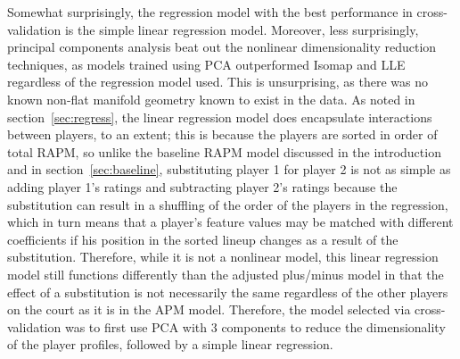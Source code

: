 \begin{table}
    \centering
    \noindent{}
    \caption{A summary of the results of hyperparameter tuning and cross-validation;
    each entry in the table is the cross-validation root mean squared error for a
    given combination of dimensionality reduction and regression techniques.}
    \label{tab:cv_results}
\end{table}

Somewhat surprisingly, the regression model with the best performance in
cross-validation is the simple linear regression model. Moreover, less surprisingly,
principal components analysis beat out the nonlinear dimensionality reduction
techniques, as models trained using PCA outperformed Isomap and LLE regardless of
the regression model used. This is unsurprising, as there was no known non-flat
manifold geometry known to exist in the data. As noted in section~\ref{sec:regress},
the linear regression model does encapsulate interactions between players, to an
extent; this is because the players are sorted in order of total RAPM, so unlike the
baseline RAPM model discussed in the introduction and in section~\ref{sec:baseline},
substituting player 1 for player 2 is not as simple as adding player 1's ratings
and subtracting player 2's ratings because the substitution can result in a
shuffling of the order of the players in the regression, which in turn means that a
player's feature values may be matched with different coefficients if his position
in the sorted lineup changes as a result of the substitution. Therefore, while it is
not a nonlinear model, this linear regression model still functions differently than
the adjusted plus/minus model in that the effect of a substitution is not
necessarily the same regardless of the other players on the court as it is in the
APM model. Therefore, the model selected via cross-validation was to first use PCA
with 3 components to reduce the dimensionality of the player profiles, followed by a
simple linear regression.

